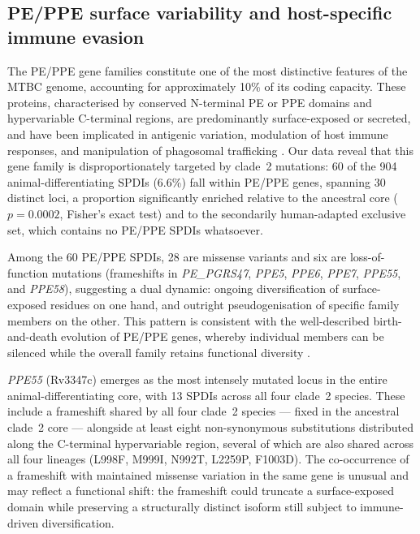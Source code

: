 \documentclass[11pt,a4paper]{article}
\begin{document}
\subsection{PE/PPE surface variability and host-specific immune evasion}
\label{sec:disc:pppe}

The PE/PPE gene families constitute one of the most distinctive features of the
MTBC genome, accounting for approximately 10\% of its coding capacity.
%
These proteins, characterised by conserved N-terminal PE or PPE domains and
hypervariable C-terminal regions, are predominantly surface-exposed or secreted,
and have been implicated in antigenic variation, modulation of host immune
responses, and manipulation of phagosomal trafficking
\cite{Banu2002, Sampson2011, Peng2022}.
%
Our data reveal that this gene family is disproportionately targeted by
clade~2 mutations: 60 of the 904 animal-differentiating SPDIs (6.6\%)
fall within PE/PPE genes, spanning 30 distinct loci, a proportion significantly
enriched relative to the ancestral core ($p = 0.0002$, Fisher's exact test)
and to the secondarily human-adapted exclusive set, which contains no PE/PPE SPDIs whatsoever.

Among the 60 PE/PPE SPDIs, 28 are missense variants and six are loss-of-function
mutations (frameshifts in \textit{PE\_PGRS47}, \textit{PPE5}, \textit{PPE6},
\textit{PPE7}, \textit{PPE55}, and \textit{PPE58}), suggesting a dual dynamic:
ongoing diversification of surface-exposed residues on one hand, and outright
pseudogenisation of specific family members on the other.
%
This pattern is consistent with the well-described birth-and-death evolution
of PE/PPE genes, whereby individual members can be silenced while the overall
family retains functional diversity \cite{Veyrier2009}.

\textit{PPE55} (Rv3347c) emerges as the most intensely mutated locus in the
entire animal-differentiating core, with 13 SPDIs across all four clade~2 species.
%
These include a frameshift shared by all four clade~2 species --- fixed in the
ancestral clade~2 core --- alongside at least eight non-synonymous substitutions
distributed along the C-terminal hypervariable region, several of which are also
shared across all four lineages (L998F, M999I, N992T, L2259P, F1003D).
%
The co-occurrence of a frameshift with maintained missense variation in the same
gene is unusual and may reflect a functional shift: the frameshift could
truncate a surface-exposed domain while preserving a structurally distinct
isoform still subject to immune-driven diversification.
\end{document}
